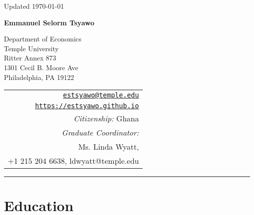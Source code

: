 \documentclass[12pt,letterpaper]{article}
\def\name{Emmanuel Selorm Tsyawo}
\renewenvironment{itemize}{
  \begin{list}{}{
    \setlength{\leftmargin}{1.5em}
  }
}{
  \end{list}
}
\begin{document}
\begin{minipage}{\linewidth}
  \begin{flushright}
    Updated \today
  \end{flushright}
\end{minipage}

\vspace{10pt}


\centerline{\huge \bf \name}

\vspace{0.25in}

\begin{minipage}{0.65\linewidth}
  Department of Economics \\
  Temple University \\
  Ritter Annex 873 \\
  1301 Cecil B. Moore Ave \\
  Philadelphia, PA 19122
\end{minipage}
\begin{minipage}{0.5\linewidth}
  \begin{tabular}{r}
    \href{mailto:estsyawo@temple.edu}{\tt estsyawo@temple.edu} \\
    \href{https://estsyawo.github.io}{\tt https://estsyawo.github.io} \\
    \emph{Citizenship:} Ghana\\
    \emph{Graduate Coordinator:} \\
    Ms. Linda Wyatt, \\
    +1 215 204 6638, {\color{blue} ldwyatt@temple.edu}
    
  \end{tabular}
\end{minipage}

\vspace{10pt}
\rule{\linewidth}{0.4pt}



\section*{Education}
\end{document}
